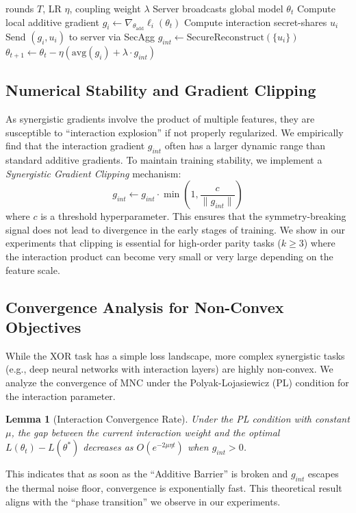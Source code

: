 \documentclass{article}
\theoremstyle{plain}
\newtheorem{lemma}[theorem]{Lemma}
\theoremstyle{definition}
\begin{document}
\begin{algorithm}[t]
   \caption{Federated MNC}
   \label{alg:mnc}
\begin{algorithmic}[1]
    rounds $T$, LR $\eta$, coupling weight $\lambda$
   \STATE Server broadcasts global model $\theta_t$
   \STATE Compute local additive gradient $g_i \leftarrow \nabla_{\theta_{\text{add}}} \ell_i(\theta_t)$
   \STATE Compute interaction secret-shares $u_i$
   \STATE Send $(g_i, u_i)$ to server via SecAgg
   \ENDFOR
   \STATE $g_{int} \leftarrow \text{SecureReconstruct}(\{u_i\})$
   \STATE $\theta_{t+1} \leftarrow \theta_t - \eta (\text{avg}(g_i) + \lambda \cdot g_{int})$
   \ENDFOR
\end{algorithmic}
\end{algorithm}

\subsection{Numerical Stability and Gradient Clipping}
As synergistic gradients involve the product of multiple features, they are susceptible to ``interaction explosion'' if not properly regularized. We empirically find that the interaction gradient $g_{int}$ often has a larger dynamic range than standard additive gradients. To maintain training stability, we implement a \emph{Synergistic Gradient Clipping} mechanism:
\begin{equation}
    g_{int} \leftarrow g_{int} \cdot \min\left(1, \frac{c}{\|g_{int}\|}\right)
\end{equation}
where $c$ is a threshold hyperparameter. This ensures that the symmetry-breaking signal does not lead to divergence in the early stages of training. We show in our experiments that clipping is essential for high-order parity tasks ($k \ge 3$) where the interaction product can become very small or very large depending on the feature scale.

\subsection{Convergence Analysis for Non-Convex Objectives}
While the XOR task has a simple loss landscape, more complex synergistic tasks (e.g., deep neural networks with interaction layers) are highly non-convex. We analyze the convergence of MNC under the Polyak-Lojasiewicz (PL) condition for the interaction parameter.
\begin{lemma}[Interaction Convergence Rate]
Under the PL condition with constant $\mu$, the gap between the current interaction weight and the optimal $L(\theta_t) - L(\theta^*)$ decreases as $O(e^{-2\mu \eta t})$ when $g_{int} > 0$.
\end{lemma}
This indicates that as soon as the ``Additive Barrier'' is broken and $g_{int}$ escapes the thermal noise floor, convergence is exponentially fast. This theoretical result aligns with the ``phase transition'' we observe in our experiments.
\end{document}
